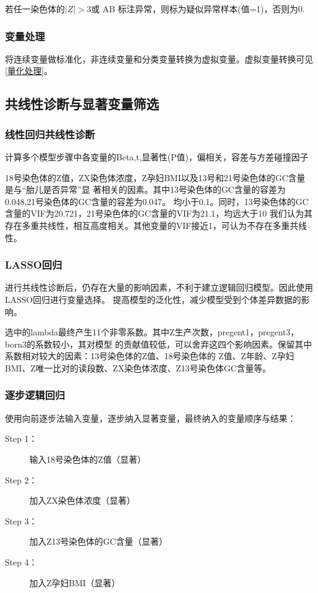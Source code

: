 \documentclass[withoutpreface,notoc]{cumcmthesis}
\begin{document}
	若任一染色体的$|Z|>3$或 AB 标注异常，则标为疑似异常样本(值=1)，否则为0.


	\subsubsection{变量处理}

	将连续变量做标准化，非连续变量和分类变量转换为虚拟变量。虚拟变量转换可见\cref{量化处理}。

	

	\subsection{共线性诊断与显著变量筛选}

	\subsubsection{线性回归共线性诊断}
	计算多个模型步骤中各变量的Beta,t,显著性(P值)，偏相关，容差与方差碰撞因子











	18号染色体的Z值，ZX染色体浓度，Z孕妇BMI以及13号和21号染色体的GC含量是与“胎儿是否异常”显
	著相关的因素。其中13号染色体的GC含量的容差为0.048,21号染色体的GC含量的容差为0.047。
	均小于0.1。同时，13号染色体的GC含量的VIF为20.721，21号染色体的GC含量的VIF为21.1，均远大于10
	我们认为其存在多重共线性，相互高度相关。其他变量的VIF接近1，可认为不存在多重共线性。



	\subsubsection{LASSO回归}
	进行共线性诊断后，仍存在大量的影响因素，不利于建立逻辑回归模型。因此使用LASSO回归进行变量选择。
	提高模型的泛化性，减少模型受到个体差异数据的影响。




	选中的lambda最终产生11个非零系数。其中Z生产次数，pregent1，pregent3，born3的系数较小，其对模型
	的贡献值较低，可以舍弃这四个影响因素。保留其中系数相对较大的因素：13号染色体的Z值、18号染色体的
	Z值、Z年龄、Z孕妇BMI、Z唯一比对的读段数、ZX染色体浓度、Z13号染色体GC含量等。


	\subsubsection{逐步逻辑回归}
	使用向前逐步法输入变量，逐步纳入显著变量，最终纳入的变量顺序与结果：
	\begin{description}
		\item[Step 1：] 输入18号染色体的Z值（显著）
		\item[Step 2：] 加入ZX染色体浓度（显著）
		\item[Step 3：] 加入Z13号染色体的GC含量（显著）
		\item[Step 4：] 加入Z孕妇BMI（显著） 
	\end{description}
\end{document}
